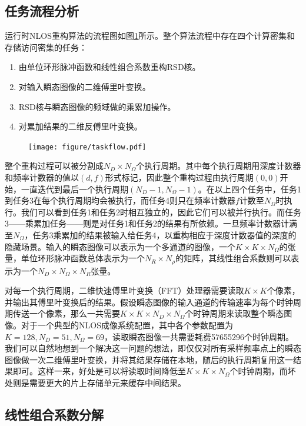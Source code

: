 \documentclass[master]{shtthesis}             %
\begin{document}
\subsection{任务流程分析}
运行时NLOS重构算法的流程图如图\ref{fig:tsk_flow}所示。整个算法流程中存在四个计算密集和存储访问密集的任务：
\begin{enumerate}
  \item 由单位环形脉冲函数和线性组合系数重构RSD核。
  \item 对输入瞬态图像的二维傅里叶变换。
  \item RSD核与瞬态图像的频域做的乘累加操作。
  \item 对累加结果的二维反傅里叶变换。
\end{enumerate}
\begin{figure}[!tb]
    \centering
    \texttt{[image: figure/taskflow.pdf]}
    \label{fig:tsk_flow}
\end{figure}

整个重构过程可以被分割成$N_D\times N_\Omega$个执行周期。其中每个执行周期用深度计数器和频率计数器的值以$(d,f)$形式标记，因此整个重构过程由执行周期$(0,0)$开始，一直迭代到最后一个执行周期$(N_D-1,N_\Omega-1)$。在以上四个任务中，任务1到任务3在每个执行周期均会被执行，而任务4则只在频率计数器$f$计数至$N_\Omega$时执行。我们可以看到任务1和任务2时相互独立的，因此它们可以被并行执行。而任务3——乘累加任务——则是对任务1和任务2的结果有所依赖。一旦频率计数器计满至$N_\Omega$，任务3乘累加的结果被输入给任务4，以重构相应于深度计数器值的深度的隐藏场景。输入的瞬态图像可以表示为一个多通道的图像，一个$K\times K\times N_\Omega$的张量，单位环形脉冲函数总体表示为一个$N_R\times N_\rho$的矩阵，其线性组合系数则可以表示为一个$N_D\times N_\Omega\times N_R$张量。

对每一个执行周期，二维快速傅里叶变换（FFT）处理器需要读取$K\times K$个像素，并输出其傅里叶变换后的结果。假设瞬态图像的输入通道的传输速率为每个时钟周期传送一个像素，那么一共需要$K\times K\times N_D\times N_\Omega$个时钟周期来读取整个瞬态图像。对于一个典型的NLOS成像系统配置\citep{Liu2020}，其中各个参数配置为$K=128, N_D=51, N_\Omega=69$，读取瞬态图像一共需要耗费57655296个时钟周期。我们可以自然地想到一个解决这一问题的想法，即仅仅对所有采样频率点上的瞬态图像做一次二维傅里叶变换，并将其结果存储在本地，随后的执行周期复用这一结果即可。这样一来，好处是可以将读取时间降低至$K\times K\times N_\Omega$个时钟周期，而坏处则是需要更大的片上存储单元来缓存中间结果。

\subsection{线性组合系数分解}
\end{document}
